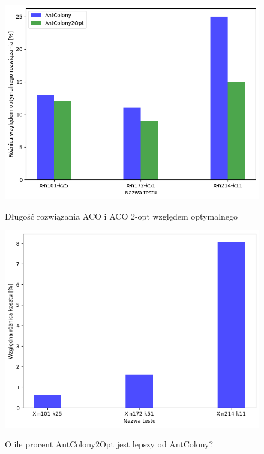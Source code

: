 \documentclass{article}
\begin{document}
\begin{figure}[H]
    \centering
    \begin{minipage}{0.48\textwidth}
        \centering
        \includegraphics[width=\linewidth]{img/2opt_wzgledem_optymalnego.png}
        \caption{Długość rozwiązania ACO i ACO 2-opt względem optymalnego}
        \label{fig:2opt_wzgledem_optymalnego}
    \end{minipage}
    \hfill
    \begin{minipage}{0.48\textwidth}
        \centering
        \includegraphics[width=\linewidth]{img/2opt_wzgledem_zwyklego.png}
        \label{fig:2opt_wzgledem_zwyklego}
        \caption{O ile procent AntColony2Opt jest lepszy od AntColony?}
    \end{minipage}
\end{figure}
\end{document}
